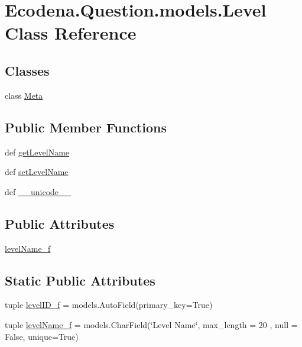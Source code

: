 \hypertarget{class_ecodena_1_1_question_1_1models_1_1_level}{
\section{Ecodena.Question.models.Level Class Reference}
\label{da/d99/class_ecodena_1_1_question_1_1models_1_1_level}
}
\subsection*{Classes}
\begin{DoxyCompactItemize}
\item 
class \hyperlink{class_ecodena_1_1_question_1_1models_1_1_level_1_1_meta}{Meta}
\end{DoxyCompactItemize}
\subsection*{Public Member Functions}
\begin{DoxyCompactItemize}
\item 
def \hyperlink{class_ecodena_1_1_question_1_1models_1_1_level_a32580cd973be245e3286215ed63a2602}{getLevelName}
\item 
def \hyperlink{class_ecodena_1_1_question_1_1models_1_1_level_ae6b5d18fa2d7076d65f15f957d46ae4e}{setLevelName}
\item 
def \hyperlink{class_ecodena_1_1_question_1_1models_1_1_level_a6bfc833419e75f89cad55a1b1635bb77}{\_\-\_\-unicode\_\-\_\-}
\end{DoxyCompactItemize}
\subsection*{Public Attributes}
\begin{DoxyCompactItemize}
\item 
\hyperlink{class_ecodena_1_1_question_1_1models_1_1_level_a3e88b34f5bc341487373ed6d98a18909}{levelName\_\-f}
\end{DoxyCompactItemize}
\subsection*{Static Public Attributes}
\begin{DoxyCompactItemize}
\item 
tuple \hyperlink{class_ecodena_1_1_question_1_1models_1_1_level_a30785034739c614bf39a00d806a3055e}{levelID\_\-f} = models.AutoField(primary\_\-key=True)
\item 
tuple \hyperlink{class_ecodena_1_1_question_1_1models_1_1_level_a382048e5ad81690f65ed99a76d75d456}{levelName\_\-f} = models.CharField(\char`\"{}Level Name\char`\"{}, max\_\-length = 20 , null = False, unique=True)
\end{DoxyCompactItemize}
